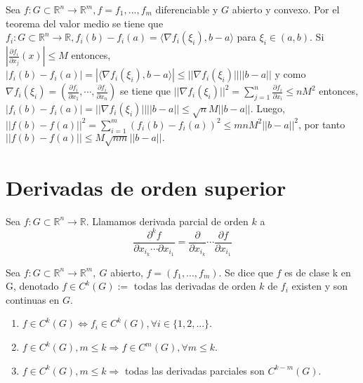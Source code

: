 \begin{dem}
Sea $f:G\subset \mathbb{R}^n\rightarrow \mathbb{R}^m, f = f_1,...,f_m$ diferenciable y $G$ abierto y convexo. Por el teorema del valor medio se tiene que $f_i:G\subset \mathbb{R}^n\rightarrow \mathbb{R}, f_i(b) - f_i(a) = \langle \nabla f_i(\xi_i), b - a \rangle$ para $\xi_i \in(a,b)$. Si $|\frac{\partial f_i}{\partial x_j}(x)| \leq M$ entonces, $|f_i(b) - f_i(a)| = |\langle \nabla f_i(\xi_i), b - a \rangle | \leq ||\nabla f_i(\xi_i)|| ||b-a||$ y  como $\nabla f_i(\xi_i) = (\frac{\partial f_i}{\partial x_1}, \cdots, \frac{\partial f_i}{\partial x_n})$ se tiene que $ ||\nabla f_i(\xi_i)||^2 = \sum_{j=1}^n \frac{\partial f_i}{\partial x_i} \leq n M^2$ entonces,  $|f_i(b) - f_i(a)| = ||\nabla f_i(\xi_i)|| ||b-a|| \leq \sqrt{n}M||b-a||$. Luego, $||f(b)- f(a)||^2= \sum_{i=1}^m(f_i(b)-f_i(a))^2 \leq mnM^2||b-a||^2$, por tanto $||f(b) - f(a)|| \leq M \sqrt{nm}||b-a||.$
\end{dem}

\section{Derivadas de orden superior}

\begin{defn}
Sea $f:G\subset\mathbb{R}^n\rightarrow\mathbb{R}$. Llamamos derivada parcial de orden $k$ a \[ \frac{\partial^k f}{\partial x_{i_k} \cdots \partial x_{i_1}} = \frac{\partial}{\partial x_{i_k}} \cdots  \frac{\partial f}{\partial x_{i_1}} \]
\end{defn}

\begin{defn}[Clase $C^k$]
Sea $f:G\subset\mathbb{R}^n\rightarrow\mathbb{R}^m, \ G$ abierto, $f = (f_1, ... , f_m)$. Se dice que $f$ es de clase k en G, denotado $ f \in C^k(G) := $ todas las derivadas de orden $k$ de $f_i$ existen y son continuas en $G$. 
\end{defn}

\begin{obs}
\begin{enumerate}[label=(\roman*)]
    \item $f \in C^k(G) \Leftrightarrow f_i \in C^k(G), \forall i \in\{1,2,...\} $. 
    \item $f\in C^k(G), m\leq k \Rightarrow f\in C^m(G), \forall m \leq k$.
    \item $f\in C^k(G), m\leq k \Rightarrow $ todas las derivadas parciales son $C^{k-m}(G)$.
\end{enumerate}
\end{obs}

